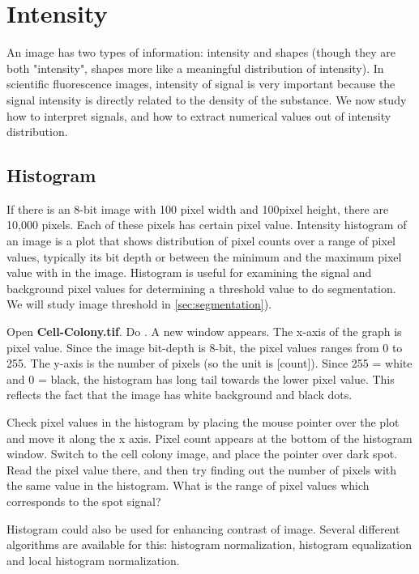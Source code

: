 
\section{Intensity}

An image has two types of information: intensity and shapes (though they
are both "intensity", shapes more
like a meaningful distribution of intensity). In scientific
fluorescence images, intensity of signal is very important because the
signal intensity is directly related to the density of the substance.
We now study how to interpret signals, and how to extract numerical
values out of intensity distribution. 

\subsection{Histogram}
\label{subsec:histogram}

If there is an 8-bit image with 100 pixel width and 100pixel height,
there are 10,000 pixels. Each of these pixels has certain pixel value.
Intensity histogram of an image is a plot that shows distribution of pixel counts over a range of pixel values, typically its bit depth or between the minimum and the maximum pixel value with in the image. Histogram is useful for examining the signal and
background pixel values for determining a threshold value to do segmentation.
We will study image threshold in \ref{sec:segmentation}). 


\begin{indentexercise}{1}
Open \textbf{Cell-Colony.tif}. Do
. A new window appears. The
x-axis of the graph is pixel value. Since the image bit-depth is 8-bit,
the pixel values ranges from 0 to 255. The y-axis is the number of
pixels (so the unit is [count]). Since 255 = white and 0 = black, the
histogram has long tail towards the lower pixel value. This reflects
the fact that the image has white background and black dots.

Check pixel values in the histogram by placing the mouse pointer over
the plot and move it along the x axis. Pixel count appears at the
bottom of the histogram window. Switch to the cell colony image, and
place the pointer over dark spot. Read the pixel value there, and then
try finding out the number of pixels with the same value in the
histogram. What is the range of pixel values which corresponds to the
spot signal?  
\end{indentexercise} 
Histogram could also be used for enhancing contrast of image. Several
different algorithms are available for this: histogram normalization,
histogram equalization and local histogram normalization. 

